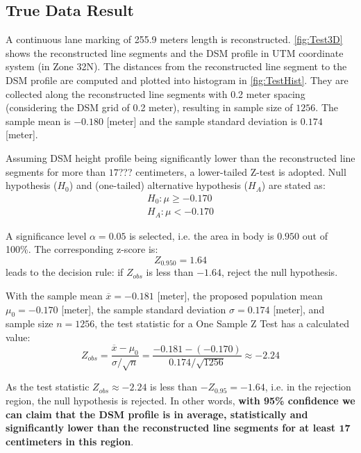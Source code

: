 \subsection{True Data Result}
\label{subsec:trueresult}

A continuous lane marking of 255.9 meters length is reconstructed. \cref{fig:Test3D} shows the reconstructed line segments and the DSM profile in UTM coordinate system (in Zone 32N). The distances from the reconstructed line segment to the DSM profile are computed and plotted into histogram in \cref{fig:TestHist}. They are collected along the reconstructed line segments with 0.2 meter spacing (considering the DSM grid of 0.2 meter), resulting in sample size of $1256$. The sample mean is $-0.180$ [meter] and the sample standard deviation is $0.174$ [meter]. %

Assuming DSM height profile being significantly lower than the reconstructed line segments for more than $17$??? centimeters, a lower-tailed Z-test is adopted. Null hypothesis ($H_0$) and (one-tailed) alternative hypothesis ($H_A$) are stated as:
\begin{equation*}
\begin{split}
H_0: \mu\geq-0.170\\
H_A: \mu<-0.170
\end{split}
\end{equation*}

A significance level $\alpha=0.05$ is selected, i.e. the area in body is $0.950$ out of 100\%. The corresponding z-score is:
\begin{equation*}
Z_{0.950}=1.64
\end{equation*}
leads to the decision rule: if $Z_{obs}$ is less than $-1.64$, reject the null hypothesis.

With the sample mean $\overline{x}=-0.181$ [meter],
the proposed population mean $\mu_0=-0.170$ [meter],
the sample standard deviation $\sigma=0.174$ [meter],
and sample size $n=1256$, the test statistic for a One Sample Z Test has a calculated value:
\begin{equation*}
Z_{obs} = \frac{\overline{x}-\mu_0}{\sigma/\sqrt{n}}=\frac{-0.181-(-0.170)}{0.174/\sqrt{1256}}\approx-2.24
\end{equation*}

As the test statistic $Z_{obs}\approx-2.24$ is less than $-Z_{0.95}=-1.64$, i.e. in the rejection region, the null hypothesis is rejected. In other words, \textbf{with 95\% confidence we can claim that the DSM profile is in average, statistically and significantly lower than the reconstructed line segments for at least $\mathbf{17}$ centimeters in this region}. %

